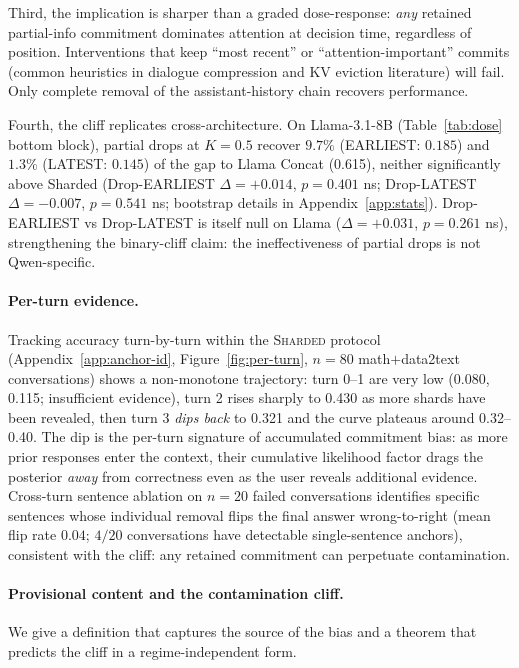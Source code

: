 \documentclass{article}
\begin{document}
Third, the implication is sharper than a graded dose-response: \emph{any} retained partial-info commitment dominates attention at decision time, regardless of position. Interventions that keep ``most recent'' or ``attention-important'' commits (common heuristics in dialogue compression and KV eviction literature) will fail. Only complete removal of the assistant-history chain recovers performance.

Fourth, the cliff replicates cross-architecture. On Llama-3.1-8B (Table~\ref{tab:dose} bottom block), partial drops at $K{=}0.5$ recover $9.7\%$ (EARLIEST: $0.185$) and $1.3\%$ (LATEST: $0.145$) of the gap to Llama Concat (0.615), neither significantly above Sharded (Drop-EARLIEST $\Delta{=}{+}0.014$, $p{=}0.401$ ns; Drop-LATEST $\Delta{=}{-}0.007$, $p{=}0.541$ ns; bootstrap details in Appendix~\ref{app:stats}). Drop-EARLIEST vs Drop-LATEST is itself null on Llama ($\Delta{=}{+}0.031$, $p{=}0.261$ ns), strengthening the binary-cliff claim: the ineffectiveness of partial drops is not Qwen-specific.

\paragraph{Per-turn evidence.}
Tracking accuracy turn-by-turn within the \textsc{Sharded} protocol (Appendix~\ref{app:anchor-id}, Figure~\ref{fig:per-turn}, $n{=}80$ math$+$data2text conversations) shows a non-monotone trajectory: turn 0--1 are very low (0.080, 0.115; insufficient evidence), turn 2 rises sharply to 0.430 as more shards have been revealed, then turn 3 \emph{dips back} to 0.321 and the curve plateaus around 0.32--0.40. The dip is the per-turn signature of accumulated commitment bias: as more prior responses enter the context, their cumulative likelihood factor drags the posterior \emph{away} from correctness even as the user reveals additional evidence. Cross-turn sentence ablation on $n{=}20$ failed conversations identifies specific sentences whose individual removal flips the final answer wrong-to-right (mean flip rate $0.04$; $4/20$ conversations have detectable single-sentence anchors), consistent with the cliff: any retained commitment can perpetuate contamination.

\paragraph{Provisional content and the contamination cliff.}

We give a definition that captures the source of the bias and a theorem that predicts the cliff in a regime-independent form.
\end{document}

